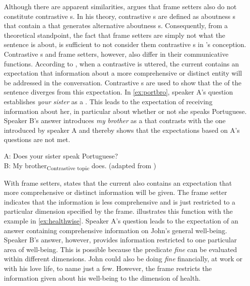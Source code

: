 Although there are apparent similarities, \citet{Krifka2008} argues that frame setters  also do not constitute contrastive s. In  his theory, contrastive s are defined as aboutness s  that contain a  that generates alternative aboutness s. Consequently, from a theoretical standpoint,  the fact that frame setters are simply not what the sentence is about, is sufficient to not consider them contrastive s in \citeauthor{Krifka2008}'s conception.   Contrastive s and frame setters, however, also differ in their communicative functions. According to \citet{Krifka2008}, when a contrastive  is uttered, the current   contains an expectation that  information about a more comprehensive or distinct entity will be addressed in the conversation. Contrastive s are used to show that the  of the sentence diverges from this expectation. In \eqref{ex:portbro}, speaker A's question establishes \emph{your sister} as a . This leads to the expectation of receiving information about her, in particular about whether or not she speaks Portuguese. Speaker B's answer introduces \emph{my brother}  as a  that contrasts with the one introduced by speaker A and thereby shows that the expectations based on A's questions are not met.


\ea\label{ex:portbro} A: Does your sister speak Portuguese?\\
B: {\ob}My brother{\cb}\textsubscript{Contrastive topic} does. (adapted from \citealt[268: ex 46]{Krifka2008})
\z



 With frame setters, \citet{Krifka2008} states that the current  also contains an expectation that more comprehensive or distinct information will be given. The frame setter indicates that the information is  less comprehensive and is just restricted to a particular dimension specified by the frame.  \citet{Krifka2008} illustrates this function with the example in \eqref{ex:healthwise}. Speaker A's question  leads to the expectation of an answer containing comprehensive information on John's general well-being. Speaker B's answer, however, provides information restricted to one particular area of well-being.  This is possible because the predicate \emph{fine} can be evaluated within different dimensions. John could also be doing \emph{fine}   financially, at work or with his love life, to name just a few. However, the frame restricts the information given about his well-being to the dimension of health. 


